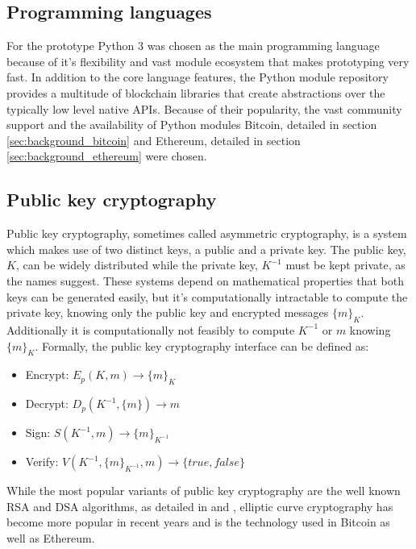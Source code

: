 \documentclass[12pt,msc,a4paper,oneside]{ucl_thesis}
\begin{document}
\subsection{Programming languages}
For the prototype Python 3 was chosen as the main programming language because of it's flexibility and vast module ecosystem that makes prototyping very fast. In addition to the core language features, the Python module repository provides a multitude of blockchain libraries that create abstractions over the typically low level native APIs. Because of their popularity, the vast community support and the availability of Python modules Bitcoin, detailed in section \ref{sec:background_bitcoin} and Ethereum, detailed in section \ref{sec:background_ethereum} were chosen.

\subsection{Public key cryptography}
Public key cryptography, sometimes called asymmetric cryptography, is a system which makes use of two distinct keys, a public and a private key. The public key, $K$, can be widely distributed while the private key, $K^{-1}$ must be kept private, as the names suggest. These systems depend on mathematical properties that both keys can be generated easily, but it's computationally intractable to compute the private key, knowing only the public key and encrypted messages $\{m\}_K$. Additionally it is computationally not feasibly to compute $K^{-1}$ or $m$ knowing $\{m\}_K$. Formally, the public key cryptography interface can be defined as: \cite{BKarp}
\begin{itemize}
    \item{Encrypt: } $E_p(K, m) \rightarrow \{m\}_K$
    \item{Decrypt: } $D_p(K^{-1}, \{m\}) \rightarrow m$
    \item{Sign: }    $S(K^{-1}, m) \rightarrow \{m\}_{K^{-1}}$
    \item{Verify: }  $V(K^{-1}, \{m\}_{K^{-1}}, m) \rightarrow \{true, false\}$
\end{itemize}

While the most popular variants of public key cryptography are the well known RSA and DSA algorithms, as detailed in \cite{RSA:1978:MOD:359340.359342} and \cite{Kerry13fipspub}, elliptic curve cryptography has become more popular in recent years and is the technology used in Bitcoin as well as Ethereum. 
\end{document}
